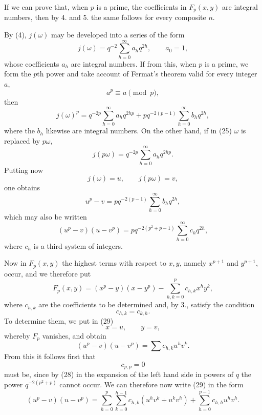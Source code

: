 \documentclass[11pt]{article}
\begin{document}
If we can prove that, when $p$ is a prime, the coefficients in $F_p(x,y)$ are integral numbers, then by 4. and 5. the same follows for every composite $n$.

By (4), $j(\omega)$ may be developed into a series of the form
\begin{equation}
j(\omega)=q^{-2}\sum_{h=0}^{\infty}a_h q^{2h},
\qquad a_0=1,
\tag{25}
\end{equation}
whose coefficients $a_h$ are integral numbers. If from this, when $p$ is a prime, we form the $p$th power and take account of Fermat's theorem valid for every integer $a$,
\[
a^p\equiv a\pmod p,
\]
then
\begin{equation}
j(\omega)^p=q^{-2p}\sum_{h=0}^{\infty}a_hq^{2hp}+p q^{-2(p-1)}\sum_{h=0}^{\infty}b_hq^{2h},
\tag{26}
\end{equation}
where the $b_h$ likewise are integral numbers. On the other hand, if in (25) $\omega$ is replaced by $p\omega$,
\begin{equation}
j(p\omega)=q^{-2p}\sum_{h=0}^{\infty}a_hq^{2hp}.
\tag{27}
\end{equation}
Putting now
\[
j(\omega)=u,
\qquad
j(p\omega)=v,
\]
one obtains
\[
u^p-v=pq^{-2(p-1)}\sum_{h=0}^{\infty}b_hq^{2h},
\]
which may also be written
\begin{equation}
(u^p-v)(u-v^p)=p q^{-2(p^2+p-1)}\sum_{h=0}^{\infty}c_hq^{2h},
\tag{28}
\end{equation}
where $c_h$ is a third system of integers.

Now in $F_p(x,y)$ the highest terms with respect to $x,y$, namely $x^{p+1}$ and $y^{p+1}$, occur, and we therefore put
\begin{equation}
F_p(x,y)=(x^p-y)(x-y^p)-\sum_{h,k=0}^{p}c_{h,k}x^hy^k,
\tag{29}
\end{equation}
where $c_{h,k}$ are the coefficients to be determined and, by 3., satisfy the condition
\[
c_{h,k}=c_{k,h}.
\]
To determine them, we put in (29)
\[
x=u,
\qquad
 y=v,
\]
whereby $F_p$ vanishes, and obtain
\begin{equation}
(u^p-v)(u-v^p)=\sum c_{h,k}u^hv^k.
\tag{30}
\end{equation}
From this it follows first that
\[
c_{p,p}=0
\]
must be, since by (28) in the expansion of the left hand side in powers of $q$ the power $q^{-2(p^2+p)}$ cannot occur. We can therefore now write (29) in the form
\begin{equation}
(u^p-v)(u-v^p)=\sum_{h=0}^{p}\sum_{k=0}^{h-1}c_{h,k}(u^hv^k+u^kv^h)
+\sum_{h=0}^{p-1}c_{h,h}u^hv^h.
\tag{31}
\end{equation}
\end{document}
